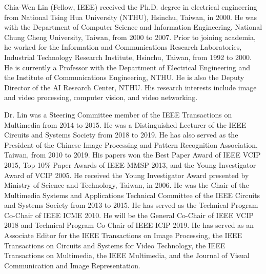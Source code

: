 \documentclass[journal]{IEEEtran}
\begin{document}
\begin{IEEEbiography}{Chia-Wen Lin} (Fellow, IEEE) received the Ph.D. degree in electrical engineering from National Tsing Hua University (NTHU), Hsinchu, Taiwan, in 2000. He was with the Department of Computer Science and Information Engineering, National Chung Cheng University, Taiwan, from 2000 to 2007. Prior to joining academia, he worked for the Information and Communications Research Laboratories, Industrial Technology Research Institute, Hsinchu, Taiwan, from 1992 to 2000. He is currently a Professor with the Department of Electrical Engineering and the Institute of Communications Engineering, NTHU. He is also the Deputy Director of the AI Research Center, NTHU. His research interests include image and video processing, computer vision, and video networking.

Dr. Lin was a Steering Committee member of the IEEE Transactions on Multimedia from 2014 to 2015. He was a Distinguished Lecturer of the IEEE Circuits and Systems Society from 2018 to 2019. He has also served as the President of the Chinese Image Processing and Pattern Recognition Association, Taiwan, from 2010 to 2019. His papers won the Best Paper Award of IEEE VCIP 2015, Top 10\% Paper Awards of IEEE MMSP 2013, and the Young Investigator Award of VCIP 2005. He received the Young Investigator Award presented by Ministry of Science and Technology, Taiwan, in 2006. He was the Chair of the Multimedia Systems and Applications Technical Committee of the IEEE Circuits and Systems Society from 2013 to 2015. He has served as the Technical Program Co-Chair of IEEE ICME 2010. He will be the General Co-Chair of IEEE VCIP 2018 and Technical Program Co-Chair of IEEE ICIP 2019. He has served as an Associate Editor for the IEEE Transactions on Image Processing, the IEEE Transactions on Circuits and Systems for Video Technology, the IEEE Transactions on Multimedia, the IEEE Multimedia, and the Journal of Visual Communication and Image Representation.
\end{IEEEbiography}




\end{document}
